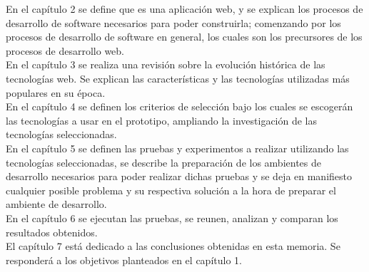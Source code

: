 En el capítulo 2 se define que es una aplicación web, y se explican los procesos de desarrollo de 
software necesarios para poder construirla; comenzando por los procesos de desarrollo de software 
en general, los cuales son los precursores de los procesos de desarrollo web.\\

En el capítulo 3 se realiza una revisión sobre la evolución histórica de las tecnologías web.
Se explican las características y las tecnologías utilizadas más populares en su época.\\

En el capítulo 4 se definen los criterios de selección bajo los cuales se escogerán las tecnologías a 
usar en el prototipo, ampliando la investigación de las tecnologías seleccionadas.\\

En el capítulo 5  se definen las pruebas y experimentos a realizar utilizando las tecnologías seleccionadas, 
se describe la preparación de los ambientes de desarrollo necesarios para poder realizar dichas pruebas y
se deja en manifiesto cualquier posible problema y su respectiva solución a la hora de preparar el
ambiente de desarrollo.\\

En el capítulo 6 se ejecutan las pruebas, se reunen, analizan y comparan los resultados obtenidos.\\

El capítulo 7  está dedicado a las conclusiones obtenidas en esta memoria. Se responderá a los
objetivos planteados en el capítulo 1.\\


\newpage